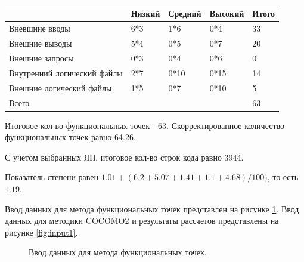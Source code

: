 \documentclass[a4paper,14pt]{article}
\begin{document}
\begin{table}[H]
\begin{tabular}{|l|l|l|l|l|}
\hline
                            & Низкий & Средний                  & Высокий                  & Итого \\ \hline
Вневшние вводы              & 6*3    & 1*6                      & 0*4                      & 33    \\ \hline
Внешние выводы              & 5*4    & 0*5                      & 0*7                      & 20    \\ \hline
Внешние запросы             & 0*3    & {0*4} & {0*6} & 0     \\ \hline
Внутренний логический файлы & 2*7    & 0*10                     & 0*15                     & 14    \\ \hline
Внешние логический файлы    & 1*5    & 0*7                      & 0*10                     & 5    \\ \hline
Всего    &     &                      &                    & 63   \\ \hline
\end{tabular}
\end{table}

Итоговое кол-во функциональных точек - 63. Скорректированное количество функциональных точек равно 64.26.

С учетом выбранных ЯП, итоговое кол-во строк кода равно 3944.

Показатель степени равен $1.01 + (6.2+5.07+1.41+1.1+4.68) / 100)$, то есть $1.19$.

Ввод данных для метода функциональных точек представлен на рисунке \ref{fig:fp_set}. Ввод данных для методики COCOMO2 и результаты рассчетов представлены на рисунке \ref{fig:input1}. 

\newpage
\begin{figure}[!h]
         \caption{Ввод данных для метода функциональных точек.}
    \label{fig:fp_set}
\end{figure}
\end{document}
